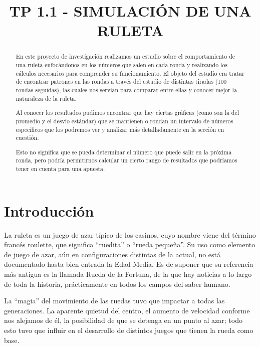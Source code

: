 


\title{TP 1.1 - SIMULACIÓN DE UNA RULETA}


\maketitle
\begin{abstract}
  En este proyecto de investigación realizamos un estudio sobre el comportamiento de una ruleta enfocándonos en los números que salen en cada ronda y realizando los cálculos necesarios para comprender su funcionamiento. El objeto del estudio era tratar de encontrar patrones en las rondas a través del estudio de distintas tiradas (100 rondas seguidas), las cuales nos servían para comparar entre ellas y conocer mejor la naturaleza de la ruleta.

  Al conocer los resultados pudimos encontrar que hay ciertas gráficas (como son la del promedio y el desvío estándar) que se mantienen o rondan un intervalo de números específicos que los podremos ver y analizar más detalladamente en la sección en cuestión.

  Esto no significa que se pueda determinar el número que puede salir en la próxima ronda, pero podría permitirnos calcular un cierto rango de resultados que podríamos tener en cuenta para una apuesta.
\end{abstract}


\section{Introducción}
La ruleta es un juego de azar típico de los casinos, cuyo nombre viene del término francés roulette, que significa ``ruedita'' o ``rueda pequeña''. Su uso como elemento de juego de azar, aún en configuraciones distintas de la actual, no está documentado hasta bien entrada la Edad Media. Es de suponer que su referencia más antigua es la llamada Rueda de la Fortuna, de la que hay noticias a lo largo de toda la historia, prácticamente en todos los campos del saber humano.

La ``magia'' del movimiento de las ruedas tuvo que impactar a todas las generaciones. La aparente quietud del centro, el aumento de velocidad conforme nos alejamos de él, la posibilidad de que se detenga en un punto al azar; todo esto tuvo que influir en el desarrollo de distintos juegos que tienen la rueda como base.

